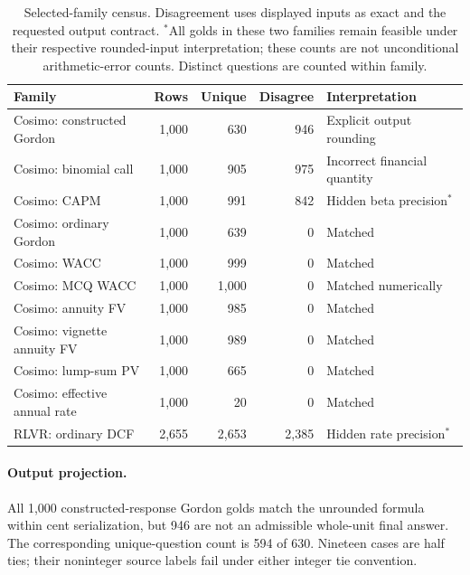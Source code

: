 \begin{table}[t]
\centering\small
\begin{tabular}{lrrrl}
\toprule
Family & Rows & Unique & Disagree & Interpretation\\
\midrule
Cosimo: constructed Gordon & 1,000 & 630 & 946 & Explicit output rounding\\
Cosimo: binomial call & 1,000 & 905 & 975 & Incorrect financial quantity\\
Cosimo: CAPM & 1,000 & 991 & 842 & Hidden beta precision$^*$\\
Cosimo: ordinary Gordon & 1,000 & 639 & 0 & Matched\\
Cosimo: WACC & 1,000 & 999 & 0 & Matched\\
Cosimo: MCQ WACC & 1,000 & 1,000 & 0 & Matched numerically\\
Cosimo: annuity FV & 1,000 & 985 & 0 & Matched\\
Cosimo: vignette annuity FV & 1,000 & 989 & 0 & Matched\\
Cosimo: lump-sum PV & 1,000 & 665 & 0 & Matched\\
Cosimo: effective annual rate & 1,000 & 20 & 0 & Matched\\
RLVR: ordinary DCF & 2,655 & 2,653 & 2,385 & Hidden rate precision$^*$\\
\bottomrule
\end{tabular}
\caption{Selected-family census. Disagreement uses displayed inputs as exact and
the requested output contract. $^*$All golds in these two families remain feasible under their respective rounded-input interpretation; these counts are not unconditional arithmetic-error counts. Distinct
questions are counted within family.}
\label{tab:census}
\end{table}

\paragraph{Output projection.} All 1,000 constructed-response Gordon golds match the unrounded formula within cent serialization, but 946 are not an admissible
whole-unit final answer. The corresponding unique-question count is 594 of 630. Nineteen cases are half ties; their noninteger source labels fail under either integer tie convention.

